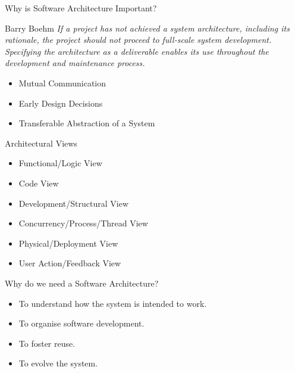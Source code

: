 \documentclass[aspectratio=1610,xcolor=dvipsnames,t,compress]{beamer}
\begin{document}
\begin{frame}{Why is Software Architecture Important?} 
    \begin{block}{Barry Boehm} 
        \emph{If a project has not achieved a system architecture, 
              including its rationale, the project should not proceed to 
              full-scale system development. 
              Specifying the architecture as a deliverable enables its 
              use throughout the development and maintenance process. }
    \end{block}
    \begin{itemize}
        \item Mutual Communication
        \item Early Design Decisions
        \item Transferable Abstraction of a System
    \end{itemize} 
\end{frame} 

\begin{frame}{Architectural Views} 
    \begin{itemize}
        \item Functional/Logic View
        \item Code View
        \item Development/Structural View
        \item Concurrency/Process/Thread View
        \item Physical/Deployment View
        \item User Action/Feedback View
    \end{itemize} 
\end{frame} 

\begin{frame}{Why do we need a Software Architecture?} 
    \begin{itemize} 
        \item To understand how the system is intended to work.
        \item To organise software development.
        \item To foster reuse.
        \item To evolve the system.
    \end{itemize}
\end{frame} 
\end{document}
